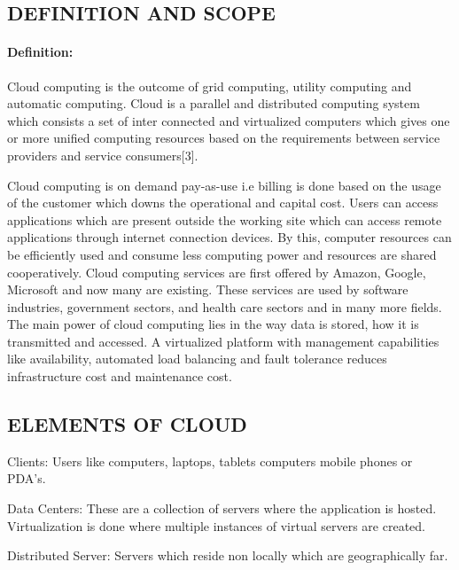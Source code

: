 \subsection{DEFINITION AND SCOPE}

\paragraph{Definition: }

Cloud computing is the outcome of grid computing, utility computing and automatic computing.
Cloud is a parallel and distributed computing system which consists a set of inter connected and virtualized
computers which gives one or more unified computing resources based on the requirements between service
providers and service consumers[3].

Cloud computing is on demand pay-as-use i.e billing is done based on the usage of the customer which
downs the operational and capital cost. Users can access applications which are present outside the working site
which can access remote applications through internet connection devices. By this, computer resources can be
efficiently used and consume less computing power and resources are shared cooperatively.
Cloud computing services are first offered by Amazon, Google, Microsoft and now many are existing.
These services are used by software industries, government sectors, and health care sectors and in many more
fields.
The main power of cloud computing lies in the way data is stored, how it is transmitted and accessed. A
virtualized platform with management capabilities like availability, automated load balancing and fault
tolerance reduces infrastructure cost and maintenance cost.

\subsection{ELEMENTS OF CLOUD}
Clients: Users like computers, laptops, tablets computers mobile phones or PDA's.

Data Centers: These are a collection of servers where the application is hosted. Virtualization is done where
multiple instances of virtual servers are created.

Distributed Server: Servers which reside non locally which are geographically far.

